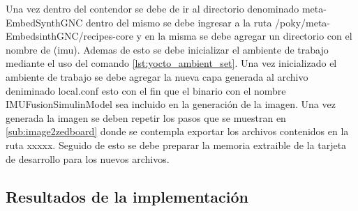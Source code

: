 Una vez dentro del contendor se debe de ir al directorio denominado meta-EmbedSynthGNC dentro del mismo se debe ingresar a la ruta /poky/meta-EmbedsinthGNC/recipes-core y en la misma se debe agregar un directorio con el nombre de (imu). Ademas de esto se debe inicializar el ambiente de trabajo mediante el uso del comando \ref{lst:yocto_ambient_set}. Una vez inicializado el ambiente de trabajo se debe agregar la nueva capa generada al archivo deniminado local.conf esto con el fin que el binario con el nombre IMUFusionSimulinModel sea incluido en la generación de la imagen. Una vez generada la imagen se deben repetir los pasos que se muestran en \ref{sub:image2zedboard} donde se contempla exportar los archivos contenidos en la ruta xxxxx. Seguido de esto se debe preparar la memoria extraible de la tarjeta de desarrollo para los nuevos archivos.

\subsection{Resultados de la implementación}

